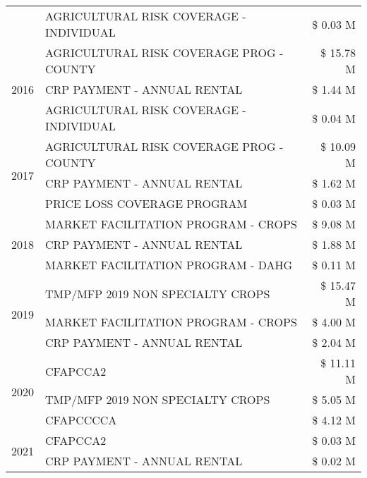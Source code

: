 \begin{tabular}{llr}
 & AGRICULTURAL RISK COVERAGE - INDIVIDUAL & \$ 0.03 M \\
\cline{1-3}
\multirow[t]{3}{*}{2016} & AGRICULTURAL RISK COVERAGE PROG - COUNTY & \$ 15.78 M \\
 & CRP PAYMENT - ANNUAL RENTAL & \$ 1.44 M \\
 & AGRICULTURAL RISK COVERAGE - INDIVIDUAL & \$ 0.04 M \\
\cline{1-3}
\multirow[t]{3}{*}{2017} & AGRICULTURAL RISK COVERAGE PROG - COUNTY & \$ 10.09 M \\
 & CRP PAYMENT - ANNUAL RENTAL & \$ 1.62 M \\
 & PRICE LOSS COVERAGE PROGRAM & \$ 0.03 M \\
\cline{1-3}
\multirow[t]{3}{*}{2018} & MARKET FACILITATION PROGRAM - CROPS & \$ 9.08 M \\
 & CRP PAYMENT - ANNUAL RENTAL & \$ 1.88 M \\
 & MARKET FACILITATION PROGRAM - DAHG & \$ 0.11 M \\
\cline{1-3}
\multirow[t]{3}{*}{2019} & TMP/MFP 2019 NON SPECIALTY CROPS & \$ 15.47 M \\
 & MARKET FACILITATION PROGRAM - CROPS & \$ 4.00 M \\
 & CRP PAYMENT - ANNUAL RENTAL & \$ 2.04 M \\
\cline{1-3}
\multirow[t]{3}{*}{2020} & CFAPCCA2 & \$ 11.11 M \\
 & TMP/MFP 2019 NON SPECIALTY CROPS & \$ 5.05 M \\
 & CFAPCCCCA & \$ 4.12 M \\
\cline{1-3}
\multirow[t]{2}{*}{2021} & CFAPCCA2 & \$ 0.03 M \\
 & CRP PAYMENT - ANNUAL RENTAL & \$ 0.02 M \\
\cline{1-3}
\bottomrule
\end{tabular}
